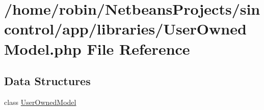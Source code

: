 \hypertarget{_user_owned_model_8php}{}\section{/home/robin/\+Netbeans\+Projects/sincontrol/app/libraries/\+User\+Owned\+Model.php File Reference}
\label{_user_owned_model_8php}
\subsection*{Data Structures}
\begin{DoxyCompactItemize}
\item 
class \hyperlink{class_user_owned_model}{User\+Owned\+Model}
\end{DoxyCompactItemize}
